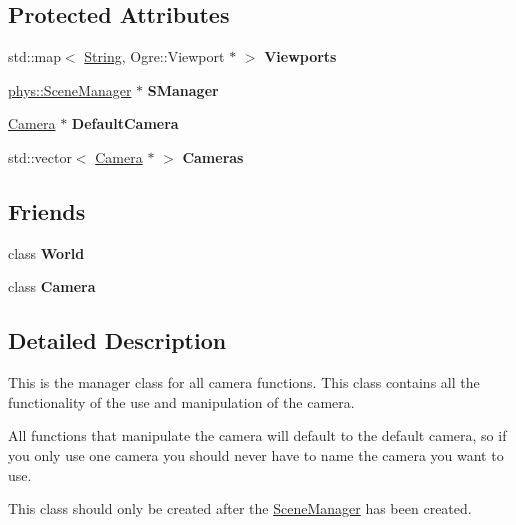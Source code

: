 \subsection*{Protected Attributes}
\begin{DoxyCompactItemize}
\item 
\hypertarget{classphys_1_1CameraManager_ab2705f97633e7cd2ecb087d0711d7d6e}{
std::map$<$ \hyperlink{namespacephys_aa03900411993de7fbfec4789bc1d392e}{String}, Ogre::Viewport $\ast$ $>$ {\bfseries Viewports}}
\label{d9/d91/classphys_1_1CameraManager_ab2705f97633e7cd2ecb087d0711d7d6e}

\item 
\hypertarget{classphys_1_1CameraManager_a8e89645398c7d334e99280cfa721d864}{
\hyperlink{classphys_1_1SceneManager}{phys::SceneManager} $\ast$ {\bfseries SManager}}
\label{d9/d91/classphys_1_1CameraManager_a8e89645398c7d334e99280cfa721d864}

\item 
\hypertarget{classphys_1_1CameraManager_a1f8aa3d003e6cfed9eee3527118518fb}{
\hyperlink{classphys_1_1Camera}{Camera} $\ast$ {\bfseries DefaultCamera}}
\label{d9/d91/classphys_1_1CameraManager_a1f8aa3d003e6cfed9eee3527118518fb}

\item 
\hypertarget{classphys_1_1CameraManager_a49af26478b62e2246ca1abd19abeec6c}{
std::vector$<$ \hyperlink{classphys_1_1Camera}{Camera} $\ast$ $>$ {\bfseries Cameras}}
\label{d9/d91/classphys_1_1CameraManager_a49af26478b62e2246ca1abd19abeec6c}

\end{DoxyCompactItemize}
\subsection*{Friends}
\begin{DoxyCompactItemize}
\item 
\hypertarget{classphys_1_1CameraManager_a7b4bcdf992c21ae83363f25df05b1d25}{
class {\bfseries World}}
\label{d9/d91/classphys_1_1CameraManager_a7b4bcdf992c21ae83363f25df05b1d25}

\item 
\hypertarget{classphys_1_1CameraManager_ad8bd9afbbd7af19d996da80e9d25890d}{
class {\bfseries Camera}}
\label{d9/d91/classphys_1_1CameraManager_ad8bd9afbbd7af19d996da80e9d25890d}

\end{DoxyCompactItemize}


\subsection{Detailed Description}
This is the manager class for all camera functions. This class contains all the functionality of the use and manipulation of the camera. \par
 All functions that manipulate the camera will default to the default camera, so if you only use one camera you should never have to name the camera you want to use. \par
 This class should only be created after the \hyperlink{classphys_1_1SceneManager}{SceneManager} has been created. 

